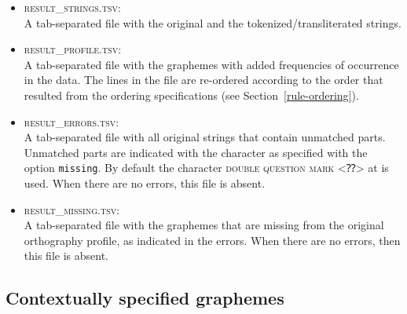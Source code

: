 \documentclass[output=book,nonflat,modfonts,
citecolor=brown,
		]{langsci/langscibook}\usepackage[]{graphicx}\usepackage[]{color}
\begin{document}
\begin{itemize}
  
   \item \textsc{result\_strings.tsv}:\\ A tab-separated file with the original
         and the tokenized/transliterated strings.

   \item \textsc{result\_profile.tsv}:\\ A tab-separated file with the
         graphemes with added frequencies of occurrence in the data. The lines
         in the file are re-ordered according to the order that resulted from the
         ordering specifications (see Section~\ref{rule-ordering}).

   \item \textsc{result\_errors.tsv}:\\ A tab-separated file with all original
         strings that contain unmatched parts. Unmatched parts are indicated
         with the character as specified with the option \texttt{missing}. By
         default the character \textsc{double question mark} <⁇> at
          is used. When there are no errors, this file is 
         absent.

    \item \textsc{result\_missing.tsv}:\\ A tab-separated file with the graphemes
          that are missing from the original orthography profile, as indicated in
          the errors. When there are no errors, then this file is absent.
          
\end{itemize}

\subsection*{Contextually specified graphemes}
\label{contextual-specification}
\end{document}
